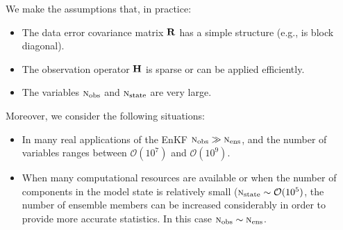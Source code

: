 \documentclass[12pt]{article}
\newcommand{\Nobs}{\textsc{n}_{{\rm obs}}}
\newcommand{\Nens}{\textsc{n}_{{\rm ens}}}
\newcommand{\Nstate}{\textsc{n}_{{\rm state}}}
\newcommand{\BO}{{\mathcal O}}
\newcommand{\R}{{\bf R}}
\newcommand{\Lo}{{\bf H}}
\begin{document}
We make the assumptions \cite{Tippett2003,Jan06} that, in practice:
\begin{itemize}
 \item The data error covariance matrix $\R$ has a simple structure (e.g., is block diagonal). 
 \item The observation operator $\Lo$ is sparse or can be applied efficiently.
 \item The variables $\Nobs$ and $\Nstate$ are very large.
\end{itemize}
Moreover, we consider the following situations:
\begin{itemize}
 \item In many real applications of the EnKF $\Nobs \gg \Nens$, and the number of variables ranges between $\BO(10^7)$ and $\BO(10^9)$.
 \item When many computational resources are available or when the number of components in the model state is relatively small  ($\Nstate \sim \BO(10^5)$, the number of ensemble members can be increased considerably in order to provide more accurate statistics. In this case $\Nobs \sim \Nens$. 
\end{itemize}
\end{document}
